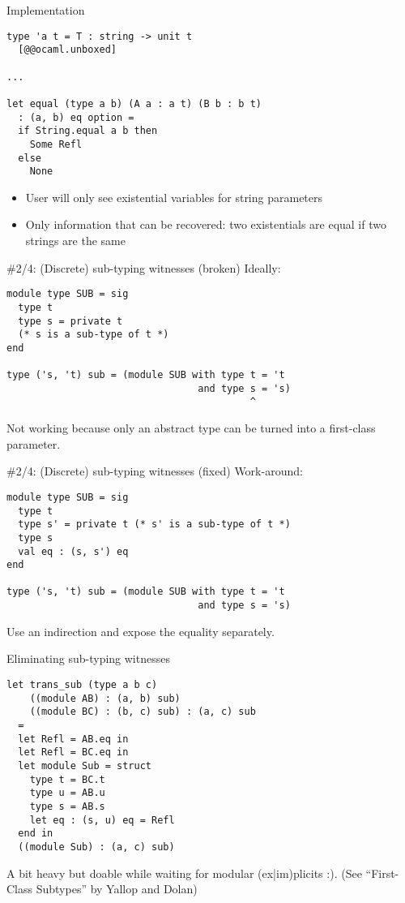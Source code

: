 \documentclass{beamer}          %
\begin{document}
\begin{frame}[fragile]{Implementation}
\begin{lstlisting}
type 'a t = T : string -> unit t
  [@@ocaml.unboxed]

...

let equal (type a b) (A a : a t) (B b : b t)
  : (a, b) eq option =
  if String.equal a b then
    Some Refl
  else
    None
\end{lstlisting}

  \begin{itemize}
    \item User will only see existential variables for string parameters
    \item Only information that can be recovered: two existentials are equal if
          two strings are the same
  \end{itemize}
\end{frame}

\begin{frame}[fragile]{\#2/4: (Discrete) sub-typing witnesses (broken)}
  Ideally:
\begin{lstlisting}
module type SUB = sig
  type t
  type s = private t
  (* s is a sub-type of t *)
end

type ('s, 't) sub = (module SUB with type t = 't
                                 and type s = 's)
                                          ^
\end{lstlisting}
  Not working because only an abstract type can be turned into a first-class parameter.
\end{frame}

\begin{frame}[fragile]{\#2/4: (Discrete) sub-typing witnesses (fixed)}
Work-around:
\begin{lstlisting}
module type SUB = sig
  type t
  type s' = private t (* s' is a sub-type of t *)
  type s
  val eq : (s, s') eq
end

type ('s, 't) sub = (module SUB with type t = 't
                                 and type s = 's)
\end{lstlisting}

  Use an indirection and expose the equality separately.
\end{frame}

\begin{frame}[fragile]{Eliminating sub-typing witnesses}

\begin{lstlisting}
let trans_sub (type a b c)
    ((module AB) : (a, b) sub)
    ((module BC) : (b, c) sub) : (a, c) sub
  =
  let Refl = AB.eq in
  let Refl = BC.eq in
  let module Sub = struct
    type t = BC.t
    type u = AB.u
    type s = AB.s
    let eq : (s, u) eq = Refl
  end in
  ((module Sub) : (a, c) sub)
\end{lstlisting}

A bit heavy but doable while waiting for modular (ex|im)plicits :).
(See ``First-Class Subtypes'' by Yallop and Dolan)
\end{frame}
\end{document}
